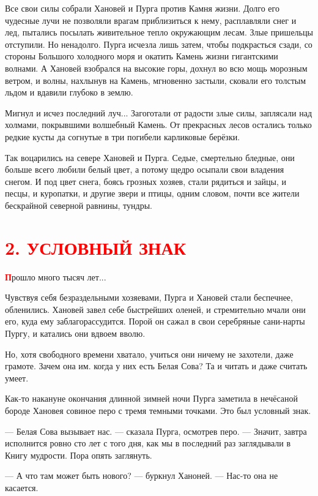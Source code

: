 \documentclass[12pt, a4paper, openany]{book}
\begin{document}
	Все свои силы собрали Хановей и Пурга против Камня жизни. Долго его чудесные лучи не позволяли врагам приблизиться к нему, расплавляли снег и лед, пытались посылать живительное тепло окружающим лесам. Злые пришельцы отступили. Но ненадолго. Пурга исчезла лишь затем, чтобы подкрасться сзади, со стороны Большого холодного моря и окатить Камень жизни гигантскими волнами. А Хановей взобрался на высокие горы, дохнул во всю мощь морозным ветром, и волны, нахлынув на Камень, мгновенно застыли, сковали его толстым льдом и вдавили глубоко в землю.
	
	Мигнул и исчез последний луч... Загоготали от радости злые силы, заплясали над холмами, покрывшими волшебный Камень. От прекрасных лесов остались только редкие кусты да согнутые в три погибели карликовые берёзки.
	
	Так воцарились на севере Хановей и Пурга. Седые, смертельно бледные, они больше всего любили белый цвет, а потому щедро осыпали свои владения снегом. И под цвет снега, боясь грозных хозяев, стали рядиться и зайцы, и песцы, и куропатки, и другие звери и птицы, одним словом, почти все жители бескрайной северной равнины, тундры.
	
		\section[2. Условный знак]{\center \textcolor{red}{2. УСЛОВНЫЙ ЗНАК}}
	
	\lettrine[findent=0pt]{\textbf{\textcolor{red}{П}}}{}рошло много тысяч лет...
	
	\qquad	Чувствуя себя безраздельными хозяевами, Пурга и Хановей стали беспечнее, обленились. Хановей завел себе быстрейших оленей, и стремительно мчали они его, куда ему заблагорассудится. Порой он сажал в свои серебряные сани-нарты Пургу, и катались они вдвоем вволю.
	
	Но, хотя свободного времени хватало, учиться они ничему не захотели, даже грамоте. Зачем она им. когда у них есть Белая Сова? Та и читать и даже считать умеет.
	
	Как-то накануне окончания длинной зимней ночи Пурга заметила в нечёсаной бороде Хановея совиное перо с тремя темными точками. Это был условный знак.
	
	— Белая Сова вызывает нас. — сказала Пурга, осмотрев перо. — Значит, завтра исполнится ровно сто лет с того дня, как мы в последний раз заглядывали в Книгу мудрости. Пора опять заглянуть.
	
	— А что там может быть нового? — буркнул Ханоней. — Нас-то она не касается.
	
\end{document}

